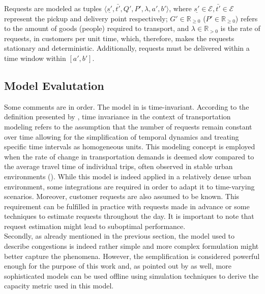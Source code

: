 Requests are modeled as tuples $\langle \underline{s'},\bar{t'}, Q', P',\lambda, a', b'\rangle$, where  $\underline{s'} \in \mathcal{E},\bar{t'} \in \mathcal{E}$ represent the pickup and delivery point respectively; $G'\in \mathbb{R}_{\ge0}$ ($P'\in \mathbb{R}_{\ge0}$) refers to the amount of goods (people) required to transport,  and $\lambda \in \mathbb{R}_{>0}$ is the rate of requests, in customers per unit time, which, therefore, makes the requests stationary and deterministic. Additionally, requests must be delivered within a time window within $[a',b']$. \\



\subsection{Model Evalutation}
Some comments are in order. The model in  is time-invariant. According to the definition presented by , time invariance in the context of transportation modeling refers to the assumption that the number of requests remain constant over time allowing for the simplification of temporal dynamics and treating specific time intervals as homogeneous units. This modeling concept is employed when the rate of change in transportation demands is deemed slow compared to the average travel time of individual trips, often observed in stable urban environments (\cite{neuburger1971}). While this model is indeed applied in a relatively dense urban environment, some integrations are required in order to adapt it to time-varying scenarios. Moreover, customer requests are also assumed to be known. This requirement can be fulfilled in practice with requests made in advance or some techniques to estimate requests throughout the day. It is important to note that request estimation might lead to suboptimal performance. \\
Secondly, as already mentioned in the previous section, the model used to describe congestions is indeed rather simple and more complex formulation might better capture the phenomena. However, the semplification is considered powerful enough for the purpose of this work and, as pointed out by  as well, more sophisticated models can be used offline using simulation techniques to derive the capacity metric used in this model.\\
